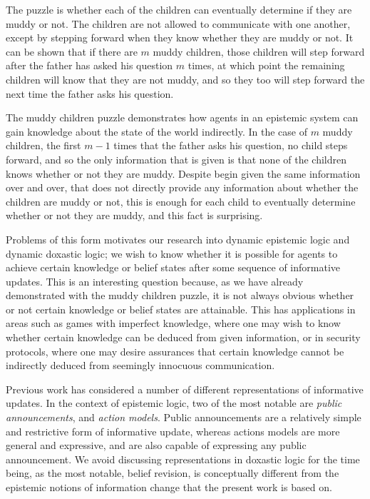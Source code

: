 The puzzle is whether each of the children can eventually determine if they are
muddy or not. The children are not allowed to communicate with one another,
except by stepping forward when they know whether they are muddy or not. It can
be shown that if there are $m$ muddy children, those children will step forward
after the father has asked his question $m$ times, at which point the remaining
children will know that they are not muddy, and so they too will step forward
the next time the father asks his question.

The muddy children puzzle demonstrates how agents in an epistemic system can
gain knowledge about the state of the world indirectly. In the case of $m$ muddy
children, the first $m - 1$ times that the father asks his question, no child
steps forward, and so the only information that is given is that none of the
children knows whether or not they are muddy. Despite begin given the same
information over and over, that does not directly provide any information about
whether the children are muddy or not, this is enough for each child to
eventually determine whether or not they are muddy, and this fact is surprising.

Problems of this form motivates our research into dynamic epistemic logic and
dynamic doxastic logic; we wish to know whether it is possible for agents to
achieve certain knowledge or belief states after some sequence of informative
updates. This is an interesting question because, as we have already
demonstrated with the muddy children puzzle, it is not always obvious whether or
not certain knowledge or belief states are attainable. This has applications in
areas such as games with imperfect knowledge, where one may wish to know whether
certain knowledge can be deduced from given information, or in security
protocols, where one may desire assurances that certain knowledge cannot be
indirectly deduced from seemingly innocuous communication.

Previous work has considered a number of different representations of
informative updates. In the context of epistemic logic, two of the most notable
are {\em public announcements}, and {\em action models}. Public announcements
are a relatively simple and restrictive form of informative update, whereas
actions models are more general and expressive, and are also capable of
expressing any public announcement. We avoid discussing representations in
doxastic logic for the time being, as the most notable, belief revision, is
conceptually different from the epistemic notions of information change that
the present work is based on.

